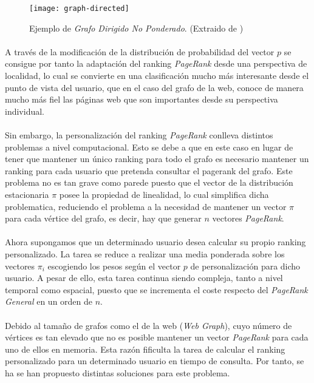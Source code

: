 \documentclass{subfiles}
\begin{document}
      \begin{figure}
        \centering
        \texttt{[image: graph-directed]}
        \caption{Ejemplo de \emph{Grafo Dirigido No Ponderado}. (Extraido de \cite{freedman2010graphs})}
        \label{img:directed_graph_example}
      \end{figure}

      \paragraph{}
      A través de la modificación de la distribución de probabilidad del vector $p$ se consigue por tanto la adaptación del ranking \emph{PageRank} desde una perspectiva de localidad, lo cual se convierte en una clasificación mucho más interesante desde el punto de vista del usuario, que en el caso del grafo de la web, conoce de manera mucho más fiel las páginas web que son importantes desde su perspectiva individual.

      \paragraph{}
      Sin embargo, la personalización del ranking \emph{PageRank} conlleva distintos problemas a nivel computacional. Esto se debe a que en este caso en lugar de tener que mantener un único ranking para todo el grafo es necesario mantener un ranking para cada usuario que pretenda consultar el pagerank del grafo. Este problema no es tan grave como parede puesto que el vector de la distribución estacionaria $\pi$ posee la propiedad de linealidad, lo cual simplifica dicha problematica, reduciendo el problema a la necesidad de mantener un vector $\pi$ para cada vértice del grafo, es decir, hay que generar $n$ vectores \emph{PageRank}.

      \paragraph{}
      Ahora supongamos que un determinado usuario desea calcular su propio ranking personalizado. La tarea se reduce a realizar una media ponderada sobre los vectores $\pi_i$ escogiendo los pesos según el vector $p$ de personalización para dicho usuario. A pesar de ello, esta tarea continua siendo compleja, tanto a nivel temporal como espacial, puesto que se incrementa el coste respecto del \emph{PageRank General} en un orden de $n$.

      \paragraph{}
      Debido al tamaño de grafos como el de la web (\emph{Web Graph}), cuyo número de vértices es tan elevado que no es posible mantener un vector \emph{PageRank} para cada uno de ellos en memoria. Esta razón fificulta la tarea de calcular el ranking personalizado para un determinado usuario en tiempo de consulta. Por tanto, se ha se han propuesto distintas soluciones para este problema.
\end{document}
